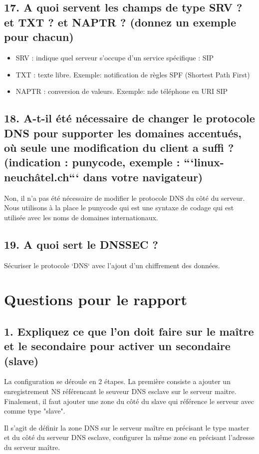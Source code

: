 \documentclass{article}
\begin{document}
\subsection*{17. A quoi servent les champs de type SRV ? et TXT ? et NAPTR ? (donnez un exemple pour chacun)}
\begin{itemize}
\item SRV : indique quel serveur s'occupe d'un service spécifique : SIP
\item TXT : texte libre. Exemple: notification de règles SPF (Shortest Path First)
\item NAPTR : conversion de valeurs. Exemple: n\degre de téléphone en URI SIP
\end{itemize}

\subsection*{18. A-t-il été nécessaire de changer le protocole DNS pour supporter les domaines accentués, où seule une modification du client a suffi ? (indication : punycode, exemple : ```linux-neuchâtel.ch``` dans votre navigateur)}
Non, il n'a pas été nécessaire de modifier le protocole DNS du côté du serveur. Nous utilisons à la place le punycode qui est une syntaxe de codage qui est utilisée avec les noms de domaines internationaux.

\subsection*{19. A quoi sert le DNSSEC ?}
Sécuriser le protocole `DNS` avec l'ajout d'un chiffrement des données.



\section{Questions pour le rapport}
\subsection*{1. Expliquez ce que l’on doit faire sur le maître et le secondaire pour activer un secondaire (slave)}
La configuration se déroule en 2 étapes. La première consiste a ajouter un enregistrement NS référencant le seuveur DNS esclave sur le serveur maitre. Finalement, il faut ajouter une zone du côté du slave qui référence le serveur avec comme type "slave".

Il s'agit de définir la zone DNS sur le serveur maître en précisant le type master et du côté du serveur DNS esclave, configurer la même zone en précisant l'adresse du serveur maître.
\end{document}
